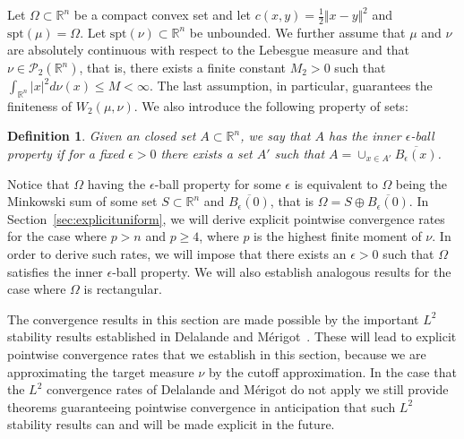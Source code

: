 \documentclass{amsart}
\theoremstyle{lemma}
\newtheorem{definition}[theorem]{Definition}
\theoremstyle{remark}
\begin{document}
Let $\Omega \subset \mathbb{R}^n$ be a compact convex set and let $c(x,y) = \frac{1}{2}\Vert x - y \Vert^2$ and $\text{spt}(\mu) = \Omega$. Let $\text{spt}(\nu) \subset \mathbb{R}^n$ be unbounded. We further assume that $\mu$ and $\nu$ are absolutely continuous with respect to the Lebesgue measure and that $\nu \in \mathcal{P}_2(\mathbb{R}^n)$, that is, there exists a finite constant $M_2>0$ such that $\int_{\mathbb{R}^n} \vert x \vert^2 d\nu(x) \leq M < \infty$. The last assumption, in particular, guarantees the finiteness of $W_2(\mu, \nu)$. We also introduce the following property of sets:
\begin{definition}\label{def:epsilonball}
Given an closed set $A \subset \mathbb{R}^n$, we say that $A$ has the inner $\epsilon$-ball property if for a fixed $\epsilon>0$ there exists a set $A '$ such that $A = \cup_{x \in A '} \overline{B_{\epsilon}(x)}$.
\end{definition}
Notice that $\Omega$ having the $\epsilon$-ball property for some $\epsilon$ is equivalent to $\Omega$ being the Minkowski sum of some set $S \subset \mathbb{R}^n$ and $\overline{B_{\epsilon}(0)}$, that is $\Omega = S \oplus \overline{B_{\epsilon}(0)}$. In Section~\ref{sec:explicituniform}, we will derive explicit pointwise convergence rates for the case where $p>n$ and $p \geq 4$, where $p$ is the highest finite moment of $\nu$. In order to derive such rates, we will impose that there exists an $\epsilon>0$ such that $\Omega$ satisfies the inner $\epsilon$-ball property. We will also establish analogous results for the case where $\Omega$ is rectangular.

The convergence results in this section are made possible by the important $L^2$ stability results established in Delalande and M\'{e}rigot~\cite{merigot1}. These will lead to explicit pointwise convergence rates that we establish in this section, because we are approximating the target measure $\nu$ by the cutoff approximation. In the case that the $L^2$ convergence rates of Delalande and M\'{e}rigot do not apply we still provide theorems guaranteeing pointwise convergence in anticipation that such $L^2$ stability results can and will be made explicit in the future.
\end{document}
